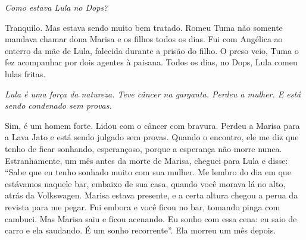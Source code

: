 \itshape
 Como estava Lula no Dops?

\normalfont 
Tranquilo. Mas estava sendo muito bem tratado. Romeu Tuma
não somente mandava chamar dona Marisa e os filhos todos os dias. Fui
com Angélica ao enterro da mãe de Lula, falecida durante a prisão do
filho. O preso veio, Tuma o fez acompanhar por dois agentes à paisana.
Todos os dias, no Dops, Lula comeu lulas fritas.

\itshape
 Lula é uma força da natureza. Teve câncer na garganta.
Perdeu a mulher. E está sendo condenado sem provas.

\normalfont 
Sim, é um homem forte. Lidou com o câncer com bravura.
Perdeu a Marisa para a Lava Jato e está sendo julgado sem provas. Quando
o encontro, ele me diz que tenho de ficar sonhando, esperançoso, porque
a esperança não morre nunca. Estranhamente, um mês antes da morte de
Marisa, cheguei para Lula e disse: ``Sabe que eu tenho sonhado muito com
sua mulher. Me lembro do dia em que estávamos naquele bar, embaixo de
sua casa, quando você morava lá no alto, atrás da Volkswagen. Marisa
estava presente, e a certa altura chegou a perua da revista para me
pegar. Fui embora e você ficou no bar, tomando pinga com cambuci. Mas
Marisa saiu e ficou acenando. Eu sonho com essa cena: eu saio de carro e
ela saudando. É um sonho recorrente''. Ela morreu um mês depois.
